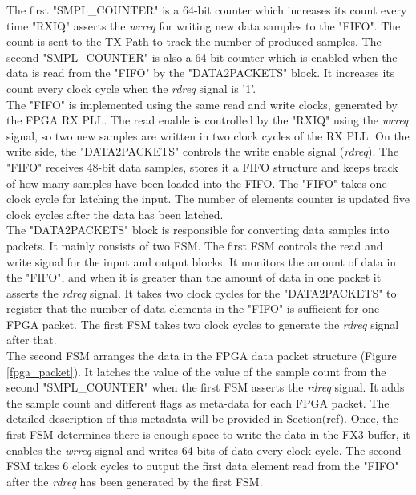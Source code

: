 The first "SMPL\_COUNTER" is a 64-bit counter which increases its count every time "RXIQ" asserts the \textit{wrreq} for writing new data samples to the "FIFO". 
The count is sent to the TX Path to track the number of produced samples. 
The second "SMPL\_COUNTER" is also a 64 bit counter which is enabled when the data is read from the "FIFO" by the "DATA2PACKETS" block.
It increases its count every clock cycle when the \textit{rdreq} signal is '1'.\\

The "FIFO" is implemented using the same read and write clocks, generated by the FPGA RX \ac{PLL}.
The read enable is controlled by the "RXIQ" using the \textit{wrreq} signal, so two new samples are written in two clock cycles of the RX PLL.
On the write side, the "DATA2PACKETS" controls the write enable signal (\textit{rdreq}).
The "FIFO" receives 48-bit data samples, stores it a \ac{FIFO} structure and keeps track of how many samples have been loaded into the \ac{FIFO}.
The "FIFO" takes one clock cycle for latching the input.
The number of elements counter is updated five clock cycles after the data has been latched.
\\

The "DATA2PACKETS" block is responsible for converting data samples into packets.
It mainly consists of two \ac{FSM}.
The first  \ac{FSM} controls the read and write signal for the input and output blocks.
It monitors the amount of data in the "FIFO", and when it is greater than the amount of data in one packet it asserts the \textit{rdreq} signal.
It takes two clock cycles for the "DATA2PACKETS" to register that the number of data elements in the "FIFO" is sufficient for one \ac{FPGA} packet.
The first \ac{FSM} takes two clock cycles to generate the \textit{rdreq} signal after that.\\ 

The second \ac{FSM} arranges the data in the FPGA data packet structure (Figure \ref{fpga_packet}).
It latches the value of the value of the sample count from the second "SMPL\_COUNTER" when the first \ac{FSM} asserts the \textit{rdreq} signal.
It adds the sample count and different flags as meta-data for each \ac{FPGA} packet. 
The detailed description of this metadata will be provided in Section(ref).
Once, the first \ac{FSM} determines there is enough space to write the data in the FX3 buffer, it enables the \textit{wrreq} signal and writes 64 bits of data every clock cycle.
The second \ac{FSM} takes 6 clock cycles to output the first data element read from the "FIFO" after the \textit{rdreq} has been generated by the first \ac{FSM}.\\

